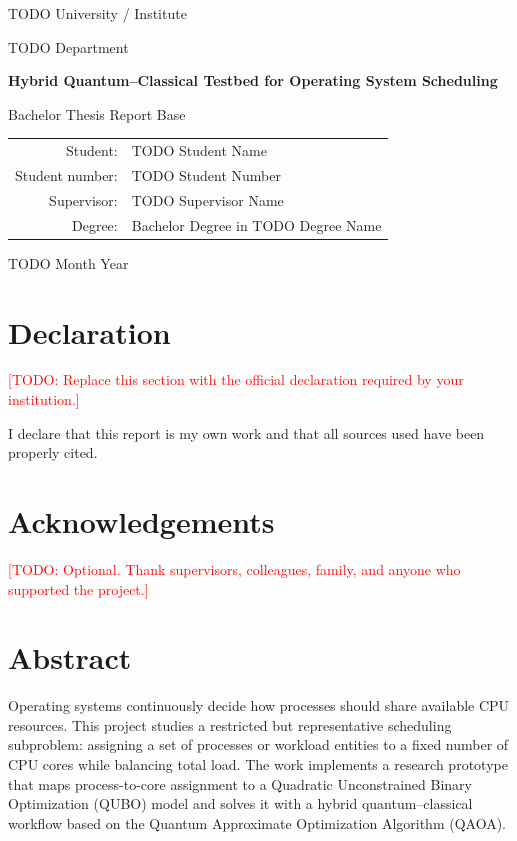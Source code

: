 \documentclass[12pt,a4paper,oneside]{report}
\newcommand{\thesistitle}{Hybrid Quantum--Classical Testbed for Operating System Scheduling}
\newcommand{\studentname}{TODO Student Name}
\newcommand{\studentnumber}{TODO Student Number}
\newcommand{\supervisor}{TODO Supervisor Name}
\newcommand{\degree}{Bachelor Degree in TODO Degree Name}
\newcommand{\institution}{TODO University / Institute}
\newcommand{\department}{TODO Department}
\newcommand{\submissiondate}{TODO Month Year}
\newcommand{\todo}[1]{\textcolor{red}{[TODO: #1]}}
\begin{document}
\begin{titlepage}
  \centering
  \vspace*{20mm}
  {\Large \institution \par}
  \vspace{4mm}
  {\large \department \par}
  \vspace{22mm}
  {\Huge\bfseries \thesistitle \par}
  \vspace{18mm}
  {\Large Bachelor Thesis Report Base \par}
  \vfill
  \begin{tabular}{rl}
    Student: & \studentname \\
    Student number: & \studentnumber \\
    Supervisor: & \supervisor \\
    Degree: & \degree \\
  \end{tabular}
  \vfill
  {\large \submissiondate \par}
\end{titlepage}


\chapter*{Declaration}
\todo{Replace this section with the official declaration required by your institution.}

I declare that this report is my own work and that all sources used have been
properly cited.

\chapter*{Acknowledgements}
\todo{Optional. Thank supervisors, colleagues, family, and anyone who supported the project.}

\chapter*{Abstract}

Operating systems continuously decide how processes should share available CPU
resources. This project studies a restricted but representative scheduling
subproblem: assigning a set of processes or workload entities to a fixed number
of CPU cores while balancing total load. The work implements a research
prototype that maps process-to-core assignment to a Quadratic Unconstrained
Binary Optimization (QUBO) model and solves it with a hybrid
quantum--classical workflow based on the Quantum Approximate Optimization
Algorithm (QAOA).
\end{document}
